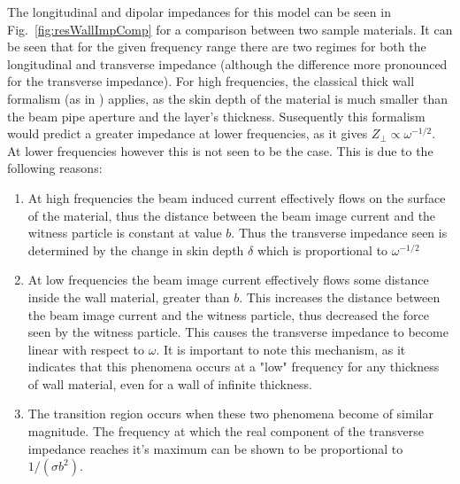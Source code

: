 The longitudinal and dipolar impedances for this model can be seen in Fig.~\ref{fig:resWallImpComp} for a comparison between two sample materials. It can be seen that for the given frequency range there are two regimes for both the longitudinal and transverse impedance (although the difference more pronounced for the transverse impedance). For high frequencies, the classical thick wall formalism (as in \cite{Chao:PhysColEff}) applies, as the skin depth of the material is much smaller than the beam pipe aperture and the layer's thickness. Susequently this formalism would predict a greater impedance at lower frequencies, as it gives $Z_{\perp} \propto \omega^{-1/2}$. At lower frequencies however this is not seen to be the case. This is due to the following reasons:

\begin{enumerate}
\item{At high frequencies the beam induced current effectively flows on the surface of the material, thus the distance between the beam image current and the witness particle is constant at value $b$. Thus the transverse impedance seen is determined by the change in skin depth $\delta$ which is proportional to $\omega^{-1/2}$}
\item{At low frequencies the beam image current effectively flows some distance inside the wall material, greater than $b$. This increases the distance between the beam image current and the witness particle, thus decreased the force seen by the witness particle. This causes the transverse impedance to become linear with respect to $\omega$. It is important to note this mechanism, as it indicates that this phenomena occurs at a "low" frequency for any thickness of wall material, even for a wall of infinite thickness.}
\item{The transition region occurs when these two phenomena become of similar magnitude. The frequency at which the real component of the transverse impedance reaches it's maximum can be shown to be proportional to $1/(\sigma b^{2})$.}
\end{enumerate}

